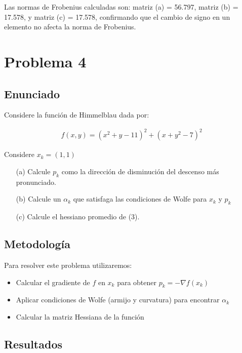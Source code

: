 \documentclass{article}
\begin{document}
Las normas de Frobenius calculadas son: matriz (a) = 56.797, matriz (b) = 17.578, y matriz (c) = 17.578, confirmando que el cambio de signo en un elemento no afecta la norma de Frobenius.

\section{Problema 4}

\subsection{Enunciado}

Considere la función de Himmelblau dada por:

\begin{align} \tag{3}
    f(x,y) = (x^2+y-11)^2+(x+y^2-7)^2
\end{align}

Considere $x_k = (1,1)$

\begin{itemize}
    \item[(a)] Calcule $p_k$ como la dirección de disminución del descenso más pronunciado.
    \item[(b)] Calcule un $\alpha_k$ que satisfaga las condiciones de Wolfe para $x_k$ y $p_k$
    \item[(c)] Calcule el hessiano promedio de (3).
\end{itemize}

\subsection{Metodología}

Para resolver este problema utilizaremos:

\begin{itemize}
    \item Calcular el gradiente de $f$ en $x_k$ para obtener $p_k = -\nabla f(x_k)$
    \item Aplicar condiciones de Wolfe (armijo y curvatura) para encontrar $\alpha_k$
    \item Calcular la matriz Hessiana de la función
\end{itemize}

\subsection{Resultados}
\setcounter{equation}{0}
\end{document}
